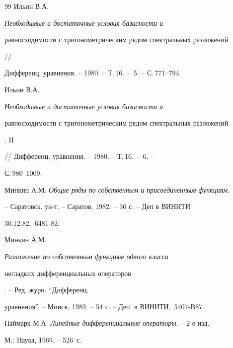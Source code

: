 \begin{thebibliography}{99}
Ильин В.А. {\em Необходимые и достаточные условия базисности и


равносходимости с тригонометрическим рядом спектральных разложений} //


Дифференц. уравнения. -- 1980. -- Т.\,16. -- \No\,5. -- С.\,771--794.




Ильин В.А. {\em Необходимые и достаточные условия базисности и


равносходимости с тригонометрическим рядом спектральных разложений}. II


// Дифференц. уравнения. -- 1980. -- Т.\,16. -- \No\,6. --


С.\,980--1009.




Минкин А.М. {\em Общие ряды по собственным и присоединенным функциям}.


-- Саратовск. ун-т. -- Саратов, 1982. -- 36 с. -- Деп в ВИНИТИ


30.12.82, \No\,6481-82.




Минкин А.М. {\em Разложение по собственным функциям одного класса


негладких дифференциальных операторов}. -- Ред. журн. ``Дифференц.


уравнения''. -- Минск, 1989. -- 54 с. -- Деп. в ВИНИТИ, \No\,5407-B87.




Наймарк М.А. {\em Линейные дифференциальные операторы}. -- 2-е изд. --


М.: Наука, 1969. -- 526~с.








\end{thebibliography}





\vskip 2cm















